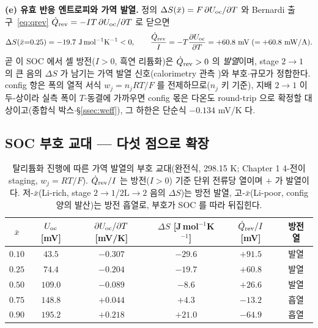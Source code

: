 \textbf{(e) 유효 반응 엔트로피와 가역 발열.} 정의 $\Delta S(\bar x)=F\,\partial U_{\mathrm{oc}}/\partial T$ 와 Bernardi
출구~\eqref{eq:qrev} $\dot Q_{\mathrm{rev}}=-IT\,\partial U_{\mathrm{oc}}/\partial T$ 로 닫으면
\begin{equation*}
\Delta S(\bar x{=}0.25)=-19.7\ \mathrm{J\,mol^{-1}K^{-1}}<0,
\qquad
\frac{\dot Q_\rev}{I}=-T\frac{\partial U_\oc}{\partial T}=+60.8\ \mathrm{mV}\;(=+60.8\ \mathrm{mW/A}).
\end{equation*}
곧 이 SOC 에서 셀 방전($I>0$, 흑연 리튬화)은 $\dot Q_{\mathrm{rev}}>0$ 의 \emph{발열}이며, stage $2\!\to\!1$ 의 큰 음의
$\Delta S$ 가 남기는 가역 발열 신호(calorimetry 관측 \cite{standardised2024})와 부호$\cdot$규모가 정합한다.
config 항은 폭의 열적 서식 $w_j{=}n_jRT/F$ 를 전제하므로($n_j$ 키 기준), 지배 $2\!\to\!1$ 이 두-상이라 실측
폭이 $T$-동결에 가까우면 config 몫은 다온도 round-trip 으로 확정할 대상이고(종합식 박스$\cdot$\S\ref{ssec:weff}),
그 하한은 단순식 $-0.134$ mV/K 다.

\subsection{SOC 부호 교대 --- 다섯 점으로 확장}\label{ssec:qrevtab}
\begin{table}[t]
\centering\small
\renewcommand{\arraystretch}{1.25}
\caption{탈리튬화 진행에 따른 가역 발열의 부호 교대(완전식, 298.15 K; Chapter 1 4-전이 staging, $w_j{=}RT/F$).
$\dot Q_{\mathrm{rev}}/I$ 는 방전($I>0$) 기준 단위 전류당 열이며 $+$ 가 발열이다. 저-$\bar x$(Li-rich, stage
$2\!\to\!1$/$2\mathrm L\!\to\!2$ 음의 $\Delta S$)는 방전 발열, 고-$\bar x$(Li-poor, config 양의 발산)는 방전
흡열로, 부호가 SOC 를 따라 뒤집힌다.}
\label{tab:qrev}
\begin{tabular}{cccccc}
\toprule
$\bar x$ & $U_{\mathrm{oc}}$ [mV] & $\partial U_{\mathrm{oc}}/\partial T$ [mV/K] & $\Delta S$ [J\,mol$^{-1}$K$^{-1}$] & $\dot Q_{\mathrm{rev}}/I$ [mV] & 방전 열 \\
\midrule
$0.10$ & $43.5$  & $-0.307$ & $-29.6$ & $+91.5$ & 발열 \\
$0.25$ & $74.4$  & $-0.204$ & $-19.7$ & $+60.8$ & 발열 \\
$0.50$ & $109.0$ & $-0.089$ & $-8.6$  & $+26.6$ & 발열 \\
$0.75$ & $148.8$ & $+0.044$ & $+4.3$  & $-13.2$ & 흡열 \\
$0.90$ & $195.2$ & $+0.218$ & $+21.0$ & $-64.9$ & 흡열 \\
\bottomrule
\end{tabular}
\end{table}

